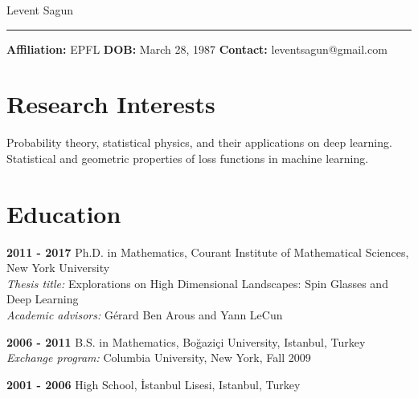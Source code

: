 \documentclass[10pt,letterpaper]{article}
\renewenvironment{itemize}
{
\begin{list}{}{\setlength{\leftmargin}{1.5em}}
}
{
  \end{list}
}
\begin{document}
{\huge Levent Sagun}

\noindent\rule{6.7in}{0.4pt}

\textbf{ Affiliation:} EPFL \textbf{ DOB:} March 28, 1987 \textbf{ Contact:} leventsagun@gmail.com

\section*{Research Interests}
\begin{itemize}
\item Probability theory, statistical physics, and their applications on deep learning. \\ Statistical and geometric properties of loss functions in machine learning.
\end{itemize}

\section*{Education}
\begin{itemize}
\item \textbf{2011 - 2017 } Ph.D. in Mathematics, Courant Institute of Mathematical Sciences, New York University \\ 
  \hspace*{2cm} \textit{ Thesis title: }{Explorations on High Dimensional Landscapes: Spin Glasses and Deep Learning} \\
  \hspace*{2cm} \textit{ Academic advisors: }{G\'erard Ben Arous and Yann LeCun}

\item \textbf{2006 - 2011 } B.S. in Mathematics, Bo\u{g}azi\c{c}i University, Istanbul, Turkey \\
    \hspace*{2cm} \textit{ Exchange program: }{Columbia University, New York, Fall 2009} %
 
\item \textbf{2001 - 2006 } High School, \.{I}stanbul Lisesi, Istanbul, Turkey%

\end{itemize}
\end{document}
